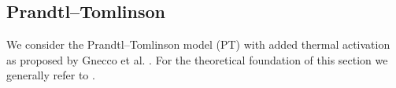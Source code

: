 \subsection{Prandtl–Tomlinson} %
We consider the Prandtl–Tomlinson model (\acrshort{PT}) with added thermal activation as proposed by Gnecco et al. \cite{PhysRevLett.84.1172}. For the theoretical foundation of this section we generally refer to \cite{Yalin_2011}.





